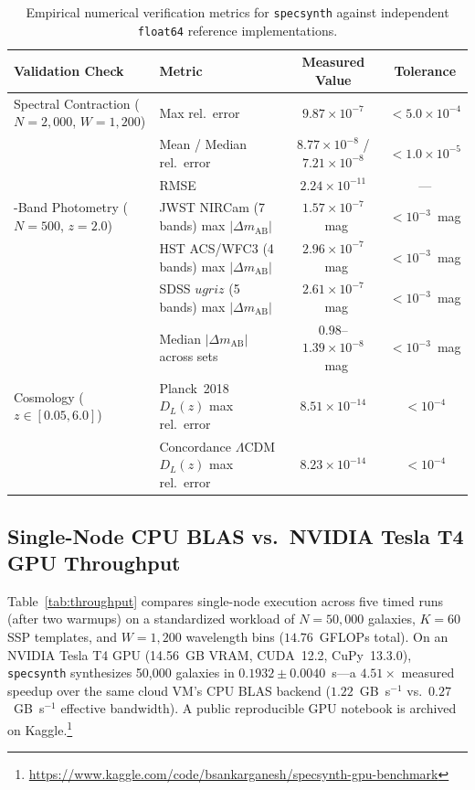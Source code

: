 \documentclass[preprint,12pt,authoryear]{elsarticle}
\begin{document}
\begin{table}[t]
\centering
\caption{Empirical numerical verification metrics for \texttt{specsynth} against independent \texttt{float64} reference implementations.}
\label{tab:correctness}
\small
\begin{tabular}{@{}llcc@{}}
\toprule
\textbf{Validation Check} & \textbf{Metric} & \textbf{Measured Value} & \textbf{Tolerance} \\
\midrule
Spectral Contraction ($N=2{,}000$, $W=1{,}200$) & Max rel.\ error & $9.87\times 10^{-7}$ & $< 5.0\times 10^{-4}$ \\
 & Mean / Median rel.\ error & $8.77\times 10^{-8}$ / $7.21\times 10^{-8}$ & $< 1.0\times 10^{-5}$ \\
 & RMSE & $2.24\times 10^{-11}$ & --- \\
\addlinespace
16-Band Photometry ($N=500$, $z=2.0$) & JWST NIRCam (7 bands) max $|\Delta m_{\mathrm{AB}}|$ & $1.57\times 10^{-7}$~mag & $< 10^{-3}$~mag \\
 & HST ACS/WFC3 (4 bands) max $|\Delta m_{\mathrm{AB}}|$ & $2.96\times 10^{-7}$~mag & $< 10^{-3}$~mag \\
 & SDSS $ugriz$ (5 bands) max $|\Delta m_{\mathrm{AB}}|$ & $2.61\times 10^{-7}$~mag & $< 10^{-3}$~mag \\
 & Median $|\Delta m_{\mathrm{AB}}|$ across sets & $0.98$--$1.39\times 10^{-8}$~mag & $< 10^{-3}$~mag \\
\addlinespace
Cosmology ($z \in [0.05, 6.0]$) & Planck~2018 $D_L(z)$ max rel.\ error & $8.51\times 10^{-14}$ & $< 10^{-4}$ \\
 & Concordance $\Lambda$CDM $D_L(z)$ max rel.\ error & $8.23\times 10^{-14}$ & $< 10^{-4}$ \\
\bottomrule
\end{tabular}
\end{table}

\subsection{Single-Node CPU BLAS vs.\ NVIDIA Tesla T4 GPU Throughput}
\label{sec:gpu}
Table~\ref{tab:throughput} compares single-node execution across five timed runs (after two warmups) on a standardized workload of $N=50{,}000$ galaxies, $K=60$ SSP templates, and $W=1{,}200$ wavelength bins ($14.76$~GFLOPs total). On an NVIDIA Tesla T4 GPU (14.56~GB VRAM, CUDA~12.2, CuPy~13.3.0), \texttt{specsynth} synthesizes 50,000 galaxies in $0.1932\pm 0.0040$~s---a $4.51\times$ measured speedup over the same cloud VM's CPU BLAS backend ($1.22$~GB~s$^{-1}$ vs.\ $0.27$~GB~s$^{-1}$ effective bandwidth). A public reproducible GPU notebook is archived on Kaggle.\footnote{\url{https://www.kaggle.com/code/bsankarganesh/specsynth-gpu-benchmark}}
\end{document}
